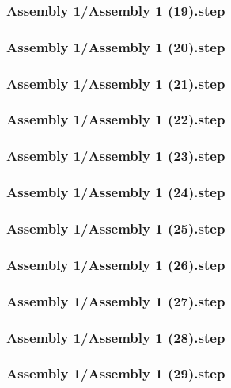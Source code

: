 \documentclass[a4paper,12pt]{article}
\begin{document}
\subsubsection{Assembly 1/Assembly 1 (19).step}

\subsubsection{Assembly 1/Assembly 1 (20).step}

\subsubsection{Assembly 1/Assembly 1 (21).step}

\subsubsection{Assembly 1/Assembly 1 (22).step}

\subsubsection{Assembly 1/Assembly 1 (23).step}

\subsubsection{Assembly 1/Assembly 1 (24).step}

\subsubsection{Assembly 1/Assembly 1 (25).step}

\subsubsection{Assembly 1/Assembly 1 (26).step}

\subsubsection{Assembly 1/Assembly 1 (27).step}

\subsubsection{Assembly 1/Assembly 1 (28).step}

\subsubsection{Assembly 1/Assembly 1 (29).step}

\end{document}
